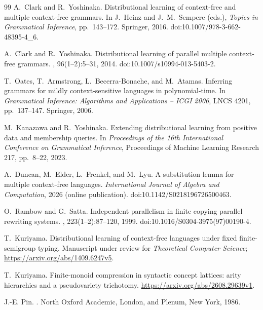 \documentclass[11pt,a4paper]{ltjsarticle}
\numberwithin{equation}{section}
\theoremstyle{plain}
\theoremstyle{definition}
\theoremstyle{remark}
\theoremstyle{plain}
\begin{document}
\begin{thebibliography}{99}
A.~Clark and R.~Yoshinaka.
\newblock Distributional learning of context-free and multiple context-free grammars.
\newblock In J.~Heinz and J.~M.~Sempere (eds.), \emph{Topics in Grammatical
Inference}, pp.~143--172. Springer, 2016.
\newblock doi:10.1007/978-3-662-48395-4\_6.

A.~Clark and R.~Yoshinaka.
\newblock Distributional learning of parallel multiple context-free grammars.
, 96(1--2):5--31, 2014.
\newblock doi:10.1007/s10994-013-5403-2.

T.~Oates, T.~Armstrong, L.~Becerra-Bonache, and M.~Atamas.
\newblock Inferring grammars for mildly context-sensitive languages in polynomial-time.
\newblock In {\em Grammatical Inference: Algorithms and Applications -- ICGI 2006},
LNCS 4201, pp.~137--147. Springer, 2006.

M.~Kanazawa and R.~Yoshinaka.
\newblock Extending distributional learning from positive data and membership queries.
\newblock In {\em Proceedings of the 16th International Conference on Grammatical Inference},
Proceedings of Machine Learning Research 217, pp.~8--22, 2023.

A.~Duncan, M.~Elder, L.~Frenkel, and M.~Lyu.
\newblock A substitution lemma for multiple context-free languages.
\newblock \emph{International Journal of Algebra and Computation},
2026 (online publication).
\newblock doi:10.1142/S0218196726500463.

O.~Rambow and G.~Satta.
\newblock Independent parallelism in finite copying parallel rewriting systems.
, 223(1--2):87--120, 1999.
\newblock doi:10.1016/S0304-3975(97)00190-4.

T.~Kuriyama.
\newblock Distributional learning of context-free languages under fixed
finite-semigroup typing.
\newblock Manuscript under review for \emph{Theoretical Computer Science};
\url{https://arxiv.org/abs/1409.6247v5}.

T.~Kuriyama.
\newblock Finite-monoid compression in syntactic concept lattices: arity
hierarchies and a pseudovariety trichotomy.
\newblock \url{https://arxiv.org/abs/2608.29639v1}.

J.-E. Pin.
.
\newblock North Oxford Academic, London, and Plenum, New York, 1986.


\end{thebibliography}
\end{document}

